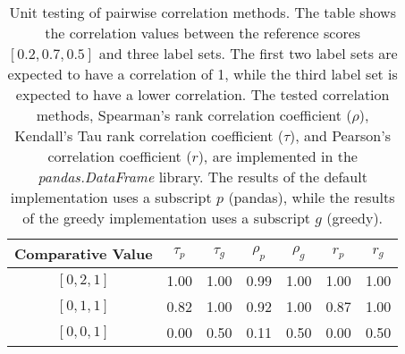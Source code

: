\begin{table}[h!]
    \centering
    \caption{
        Unit testing of pairwise correlation methods. The table shows the correlation values between the reference scores $[0.2, 0.7, 0.5]$ and three label sets. The first two label sets are expected to have a correlation of 1, while the third label set is expected to have a lower correlation. The tested correlation methods, Spearman's rank correlation coefficient ($\rho$), Kendall's Tau rank correlation coefficient ($\tau$), and Pearson's correlation coefficient ($r$), are implemented in the \textit{pandas.DataFrame} library. The results of the default implementation uses a subscript $p$ (pandas), while the results of the greedy implementation uses a subscript $g$ (greedy).
    }
    \begin{tabular}{ccccccc}
        \toprule
        \textbf{Comparative Value} & $\tau_p$ & $\tau_g$ & $\rho_p$ & $\rho_g$ & $r_p$ & $r_g$ \\
        \midrule
        $[0, 2, 1]$ & 1.00 & 1.00 & 0.99 & 1.00 & 1.00 & 1.00 \\
        $[0, 1, 1]$ & 0.82 & 1.00 & 0.92 & 1.00 & 0.87 & 1.00 \\
        $[0, 0, 1]$ & 0.00 & 0.50 & 0.11 & 0.50 & 0.00 & 0.50 \\
        \bottomrule
    \end{tabular}
\end{table}
